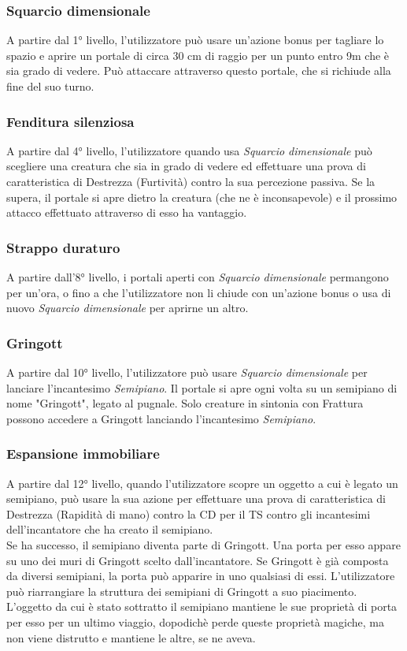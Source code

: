 \subsubsection{Squarcio dimensionale}
A partire dal 1° livello, l'utilizzatore può usare un'azione bonus per tagliare lo spazio e aprire un portale di circa 30 cm di raggio per un punto entro 9m che è sia grado di vedere. Può attaccare attraverso questo portale, che si richiude alla fine del suo turno.

\subsubsection{Fenditura silenziosa}
A partire dal 4° livello, l'utilizzatore quando usa \textit{Squarcio dimensionale} può scegliere una creatura che sia in grado di vedere ed effettuare una prova di caratteristica di Destrezza (Furtività) contro la sua percezione passiva. Se la supera, il portale si apre dietro la creatura (che ne è inconsapevole) e il prossimo attacco effettuato attraverso di esso ha vantaggio.

\subsubsection{Strappo duraturo}
A partire dall'8° livello, i portali aperti con \textit{Squarcio dimensionale} permangono per un'ora, o fino a che l'utilizzatore non li chiude con un'azione bonus o usa di nuovo \textit{Squarcio dimensionale} per aprirne un altro.

\subsubsection{Gringott}
A partire dal 10° livello, l'utilizzatore può usare \textit{Squarcio dimensionale} per lanciare l'incantesimo \textit{Semipiano}. Il portale si apre ogni volta su un semipiano di nome "Gringott", legato al pugnale. Solo creature in sintonia con Frattura possono accedere a Gringott lanciando l'incantesimo \textit{Semipiano}.

\subsubsection{Espansione immobiliare}
A partire dal 12° livello, quando l'utilizzatore scopre un oggetto a cui è legato un semipiano, può usare la sua azione per effettuare una prova di caratteristica di Destrezza (Rapidità di mano) contro la CD per il TS contro gli incantesimi dell'incantatore che ha creato il semipiano.\\
Se ha successo, il semipiano diventa parte di Gringott. Una porta per esso appare su uno dei muri di Gringott scelto dall'incantatore. Se Gringott è già composta da diversi semipiani, la porta può apparire in uno qualsiasi di essi. L'utilizzatore può riarrangiare la struttura dei semipiani di Gringott a suo piacimento.\\
L'oggetto da cui è stato sottratto il semipiano mantiene le sue proprietà di porta per esso per un ultimo viaggio, dopodichè perde queste proprietà magiche, ma non viene distrutto e mantiene le altre, se ne aveva.

